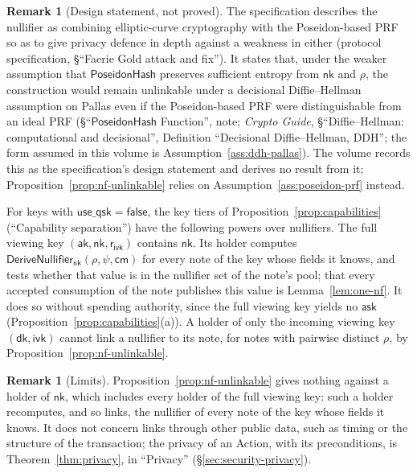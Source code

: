 \documentclass[11pt,a4paper]{article}
\theoremstyle{definition}
\newtheorem{remark}[theorem]{Remark}
\newcommand{\cmsym}{\mathsf{cm}}
\newcommand{\ask}{\ensuremath{\mathsf{ask}}}
\newcommand{\aksym}{\ensuremath{\mathsf{ak}}}
\newcommand{\nksym}{\ensuremath{\mathsf{nk}}}
\newcommand{\ivk}{\ensuremath{\mathsf{ivk}}}
\newcommand{\dk}{\ensuremath{\mathsf{dk}}}
\newcommand{\rivk}{\ensuremath{\mathsf{r_{ivk}}}}
\begin{document}
\begin{remark}[Design statement, not proved]
The specification describes the nullifier as combining elliptic-curve
cryptography with the Poseidon-based PRF so as to give privacy defence in
depth against a weakness in either (protocol specification, \S``Faerie Gold
attack and fix''). It states that, under the weaker assumption that
$\mathsf{PoseidonHash}$ preserves sufficient entropy from $\nksym$ and
$\rho$, the construction would remain unlinkable under a decisional
Diffie--Hellman assumption on Pallas even if the Poseidon-based PRF were
distinguishable from an ideal PRF (\S``$\mathsf{PoseidonHash}$ Function'',
note; \emph{Crypto Guide}, \S``Diffie--Hellman: computational and
decisional'', Definition ``Decisional Diffie--Hellman, DDH''; the form
assumed in this volume is Assumption~\ref{ass:ddh-pallas}). The volume
records this as the specification's design statement and derives no result
from it; Proposition~\ref{prop:nf-unlinkable} relies on
Assumption~\ref{ass:poseidon-prf} instead.
\end{remark}

For keys with $\mathsf{use\_qsk} = \mathsf{false}$, the key tiers of
Proposition~\ref{prop:capabilities} (``Capability separation'') have the
following powers over nullifiers. The full viewing key
$(\aksym, \nksym, \rivk)$ contains $\nksym$. Its holder computes
$\mathsf{DeriveNullifier}_{\nksym}(\rho, \psi, \cmsym)$ for every note of the
key whose fields it knows, and tests whether that value is in the nullifier
set of the note's pool; that every accepted consumption of the note
publishes this value is Lemma~\ref{lem:one-nf}. It does so without spending
authority, since the full viewing key yields no $\ask$
(Proposition~\ref{prop:capabilities}(a)). A holder of only the incoming
viewing key $(\dk, \ivk)$ cannot link a nullifier to its note, for notes with
pairwise distinct $\rho$, by Proposition~\ref{prop:nf-unlinkable}.

\begin{remark}[Limits]
Proposition~\ref{prop:nf-unlinkable} gives nothing against a holder of
$\nksym$, which includes every holder of the full viewing key: such a holder
recomputes, and so links, the nullifier of every note of the key whose
fields it knows. It does not concern links through other public data, such
as timing or the structure of the transaction; the privacy of an Action,
with its preconditions, is Theorem~\ref{thm:privacy}, in ``Privacy''
(\S\ref{sec:security-privacy}).
\end{remark}
\end{document}

